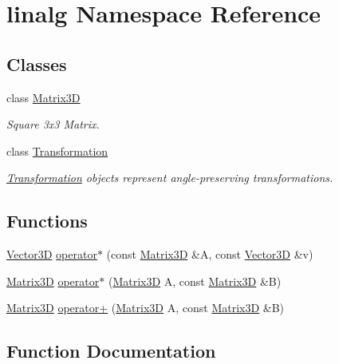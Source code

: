 \hypertarget{namespacelinalg}{}\section{linalg Namespace Reference}
\label{namespacelinalg}
\subsection*{Classes}
\begin{DoxyCompactItemize}
\item 
class \mbox{\hyperlink{classlinalg_1_1Matrix3D}{Matrix3D}}
\begin{DoxyCompactList}\small\item\em Square 3x3 Matrix. \end{DoxyCompactList}\item 
class \mbox{\hyperlink{classlinalg_1_1Transformation}{Transformation}}
\begin{DoxyCompactList}\small\item\em \mbox{\hyperlink{classlinalg_1_1Transformation}{Transformation}} objects represent angle-\/preserving transformations. \end{DoxyCompactList}\end{DoxyCompactItemize}
\subsection*{Functions}
\begin{DoxyCompactItemize}
\item 
\mbox{\hyperlink{classVector3D}{Vector3D}} \mbox{\hyperlink{namespacelinalg_a64ac8620c880fd85e0163941dbd2ce92}{operator$\ast$}} (const \mbox{\hyperlink{classlinalg_1_1Matrix3D}{Matrix3D}} \&A, const \mbox{\hyperlink{classVector3D}{Vector3D}} \&v)
\item 
\mbox{\hyperlink{classlinalg_1_1Matrix3D}{Matrix3D}} \mbox{\hyperlink{namespacelinalg_a6bacae184309d12c829d272de83d0534}{operator$\ast$}} (\mbox{\hyperlink{classlinalg_1_1Matrix3D}{Matrix3D}} A, const \mbox{\hyperlink{classlinalg_1_1Matrix3D}{Matrix3D}} \&B)
\item 
\mbox{\hyperlink{classlinalg_1_1Matrix3D}{Matrix3D}} \mbox{\hyperlink{namespacelinalg_a556fef68037fa24314207620fa918536}{operator+}} (\mbox{\hyperlink{classlinalg_1_1Matrix3D}{Matrix3D}} A, const \mbox{\hyperlink{classlinalg_1_1Matrix3D}{Matrix3D}} \&B)
\end{DoxyCompactItemize}


\subsection{Function Documentation}
\mbox{\label{namespacelinalg_a64ac8620c880fd85e0163941dbd2ce92}} 
